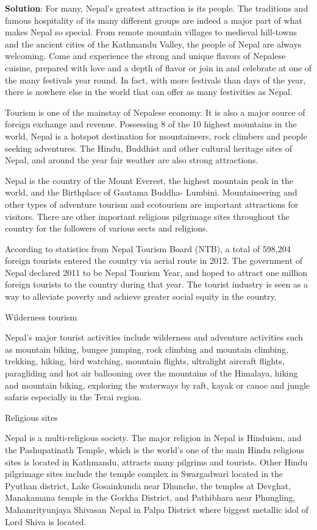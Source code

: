 \documentclass[
]{book}
\newenvironment{solution}{ {\bfseries Solution}:}{}
\begin{document}
\begin{questions}
\begin{solution}
For many, Nepal’s greatest attraction is its people. The traditions and famous hospitality of its many different groups are indeed a major part of what makes Nepal so special. From remote mountain villages to medieval hill-towns and the ancient cities of the Kathmandu Valley, the people of Nepal are always welcoming. Come and experience the strong and unique flavors of Nepalese cuisine, prepared with love and a depth of flavor or join in and celebrate at one of the many festivals year round. In fact, with more festivals than days of the year, there is nowhere else in the world that can offer as many festivities as Nepal.

Tourism is one of the mainstay of Nepalese economy. It is also a major source of foreign exchange and revenue. Possessing 8 of the 10 highest mountains in the world, Nepal is a hotspot destination for mountaineers, rock climbers and people seeking adventures. The Hindu, Buddhist and other cultural heritage sites of Nepal, and around the year fair weather are also strong attractions.

Nepal is the country of the Mount Everest, the highest mountain peak in the world, and the Birthplace of Gautama Buddha- Lumbini. Mountaineering and other types of adventure tourism and ecotourism are important attractions for visitors. There are other important religious pilgrimage sites throughout the country for the followers of various sects and religions.

According to statistics from Nepal Tourism Board (NTB), a total of 598,204 foreign tourists entered the country via aerial route in 2012. The government of Nepal declared 2011 to be Nepal Tourism Year, and hoped to attract one million foreign tourists to the country during that year. The tourist industry is seen as a way to alleviate poverty and achieve greater social equity in the country.

Wilderness tourism

Nepal’s major tourist activities include wilderness and adventure activities such as mountain biking, bungee jumping, rock climbing and mountain climbing, trekking, hiking, bird watching, mountain flights, ultralight aircraft flights, paragliding and hot air ballooning over the mountains of the Himalaya, hiking and mountain biking, exploring the waterways by raft, kayak or canoe and jungle safaris especially in the Terai region.

Religious sites

Nepal is a multi-religious society. The major religion in Nepal is Hinduism, and the Pashupatinath Temple, which is the world’s one of the main Hindu religious sites is located in Kathmandu, attracts many pilgrims and tourists. Other Hindu pilgrimage sites include the temple complex in Swargadwari located in the Pyuthan district, Lake Gosainkunda near Dhunche, the temples at Devghat, Manakamana temple in the Gorkha District, and Pathibhara near Phungling, Mahamrityunjaya Shivasan Nepal in Palpa District where biggest metallic idol of Lord Shiva is located.


\end{solution}
\end{questions}
\end{document}
